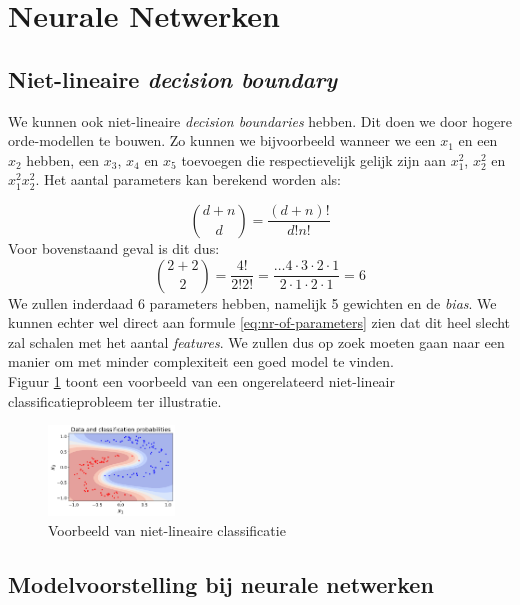 \section{Neurale Netwerken}

\subsection{Niet-lineaire \textit{decision boundary}}

We kunnen ook niet-lineaire \textit{decision boundaries} hebben. Dit doen we door hogere orde-modellen te bouwen. Zo kunnen we bijvoorbeeld wanneer we een $x_{1}$ en een $x_{2}$ hebben, een $x_{3}$, $x_{4}$ en $x_{5}$ toevoegen die respectievelijk gelijk zijn aan $x_{1}^{2}$, $x_{2}^{2}$ en $x_{1}^{2} x_{2}^{2}$. Het aantal parameters kan berekend worden als:

\begin{equation}
	{d + n \choose d} = \frac{(d+n)!}{d! n!}
	\label{eq:nr-of-parameters}
\end{equation}
\noindent
Voor bovenstaand geval is dit dus: 
\begin{equation*}
	{2 + 2 \choose 2} = \frac{4!}{2! 2!} = \frac{\ldots4\cdot 3\cdot 2\cdot 1}{2\cdot 1\cdot 2\cdot 1} = 6
\end{equation*}
\newpage
\noindent
We zullen inderdaad 6 parameters hebben, namelijk 5 gewichten en de \textit{bias}. We kunnen echter wel direct aan formule \ref{eq:nr-of-parameters} zien dat dit heel slecht zal schalen met het aantal \textit{features}. We zullen dus op zoek moeten gaan naar een manier om met minder complexiteit een goed model te vinden. \\
\newline
Figuur \ref{fig:non-linear-classification} toont een voorbeeld van een ongerelateerd niet-lineair classificatieprobleem ter illustratie.
\begin{figure}[h]
	\centering
	\includegraphics[width=0.3\textwidth]{images/12-non-linear-classification.png}
	\caption{Voorbeeld van niet-lineaire classificatie}
	\label{fig:non-linear-classification}
\end{figure}

\subsection{Modelvoorstelling bij neurale netwerken}

